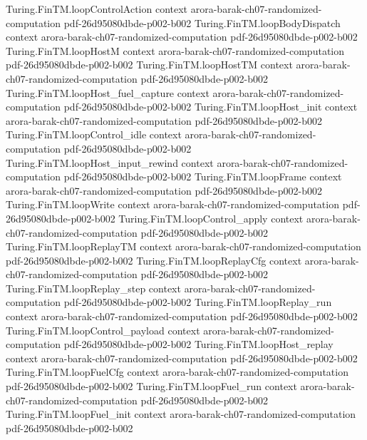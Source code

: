 \begin{theorem}
\proofstep
  {Turing.FinTM.loopControlAction}
  {context}
  {arora-barak-ch07-randomized-computation}
  {pdf-26d95080dbde-p002-b002}
\proofstep
  {Turing.FinTM.loopBodyDispatch}
  {context}
  {arora-barak-ch07-randomized-computation}
  {pdf-26d95080dbde-p002-b002}
\proofstep
  {Turing.FinTM.loopHostM}
  {context}
  {arora-barak-ch07-randomized-computation}
  {pdf-26d95080dbde-p002-b002}
\proofstep
  {Turing.FinTM.loopHostTM}
  {context}
  {arora-barak-ch07-randomized-computation}
  {pdf-26d95080dbde-p002-b002}
\proofstep
  {Turing.FinTM.loopHost_fuel_capture}
  {context}
  {arora-barak-ch07-randomized-computation}
  {pdf-26d95080dbde-p002-b002}
\proofstep
  {Turing.FinTM.loopHost_init}
  {context}
  {arora-barak-ch07-randomized-computation}
  {pdf-26d95080dbde-p002-b002}
\proofstep
  {Turing.FinTM.loopControl_idle}
  {context}
  {arora-barak-ch07-randomized-computation}
  {pdf-26d95080dbde-p002-b002}
\proofstep
  {Turing.FinTM.loopHost_input_rewind}
  {context}
  {arora-barak-ch07-randomized-computation}
  {pdf-26d95080dbde-p002-b002}
\proofstep
  {Turing.FinTM.loopFrame}
  {context}
  {arora-barak-ch07-randomized-computation}
  {pdf-26d95080dbde-p002-b002}
\proofstep
  {Turing.FinTM.loopWrite}
  {context}
  {arora-barak-ch07-randomized-computation}
  {pdf-26d95080dbde-p002-b002}
\proofstep
  {Turing.FinTM.loopControl_apply}
  {context}
  {arora-barak-ch07-randomized-computation}
  {pdf-26d95080dbde-p002-b002}
\proofstep
  {Turing.FinTM.loopReplayTM}
  {context}
  {arora-barak-ch07-randomized-computation}
  {pdf-26d95080dbde-p002-b002}
\proofstep
  {Turing.FinTM.loopReplayCfg}
  {context}
  {arora-barak-ch07-randomized-computation}
  {pdf-26d95080dbde-p002-b002}
\proofstep
  {Turing.FinTM.loopReplay_step}
  {context}
  {arora-barak-ch07-randomized-computation}
  {pdf-26d95080dbde-p002-b002}
\proofstep
  {Turing.FinTM.loopReplay_run}
  {context}
  {arora-barak-ch07-randomized-computation}
  {pdf-26d95080dbde-p002-b002}
\proofstep
  {Turing.FinTM.loopControl_payload}
  {context}
  {arora-barak-ch07-randomized-computation}
  {pdf-26d95080dbde-p002-b002}
\proofstep
  {Turing.FinTM.loopHost_replay}
  {context}
  {arora-barak-ch07-randomized-computation}
  {pdf-26d95080dbde-p002-b002}
\proofstep
  {Turing.FinTM.loopFuelCfg}
  {context}
  {arora-barak-ch07-randomized-computation}
  {pdf-26d95080dbde-p002-b002}
\proofstep
  {Turing.FinTM.loopFuel_run}
  {context}
  {arora-barak-ch07-randomized-computation}
  {pdf-26d95080dbde-p002-b002}
\proofstep
  {Turing.FinTM.loopFuel_init}
  {context}
  {arora-barak-ch07-randomized-computation}
  {pdf-26d95080dbde-p002-b002}

\end{theorem}
